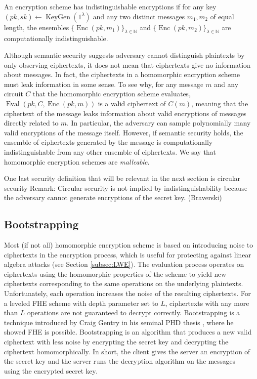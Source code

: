 \begin{definition}
    An encryption scheme has indistinguishable encryptions if for any key $(pk,sk) \leftarrow \operatorname{KeyGen}(1^{\lambda})$ and any two distinct messages $m_1, m_2$ of equal length, the ensembles $\{\operatorname{Enc}(pk,m_1)\}_{\lambda \in \mathbb{N}}$ and $\{\operatorname{Enc}(pk,m_2)\}_{\lambda \in \mathbb{N}}$ are computationally indistinguishable.
\end{definition}

Although semantic security suggests adversary cannot distinguish plaintexts by only observing ciphertexts, it does not mean that ciphertexts give no information about messages. In fact, the ciphertexts in a homomorphic encryption scheme must leak information in some sense. To see why, for any message $m$ and any circuit $C$ that the homomorphic encryption scheme evaluates, $\operatorname{Eval}(pk,C,\operatorname{Enc}(pk,m))$ is a valid ciphertext of $C(m)$, meaning that the ciphertext of the message leaks information about valid encryptions of messages directly related to $m$. In particular, the adversary can sample polynomially many valid encryptions of the message itself. However, if semantic security holds, the ensemble of ciphertexts generated by the message is computationally indistinguishable from any other ensemble of ciphertexts. We say that homomorphic encryption schemes are \textit{malleable}.

One last security definition that will be relevant in the next section is circular security
Remark: Circular security is not implied by indistinguishability because the adversary cannot generate encryptions of the secret key. (Braverski)

\subsection*{Bootstrapping}
Most (if not all) homomorphic encryption scheme is based on introducing noise to ciphertexts in the encryption process, which is useful for protecting against linear algebra attacks (see Section \ref{subsec:LWE}). The evaluation process operates on ciphertexts using the homomorphic properties of the scheme to yield new ciphertexts corresponding to the same operations on the underlying plaintexts. Unfortunately, each operation increases the noise of the resulting ciphertexts. For a leveled FHE scheme with depth parameter set to $L$, ciphertexts with any more than $L$ operations are not guaranteed to decrypt correctly. Bootstrapping is a technique introduced by Craig Gentry in his seminal PHD thesis \cite{Gentry-Thesis}, where he showed FHE is possible. Bootstrapping is an algorithm that produces a new valid ciphertext with less noise by encrypting the secret key and decrypting the ciphertext homomorphically. In short, the client gives the server an encryption of the secret key and the server runs the decryption algorithm on the messages using the encrypted secret key.

